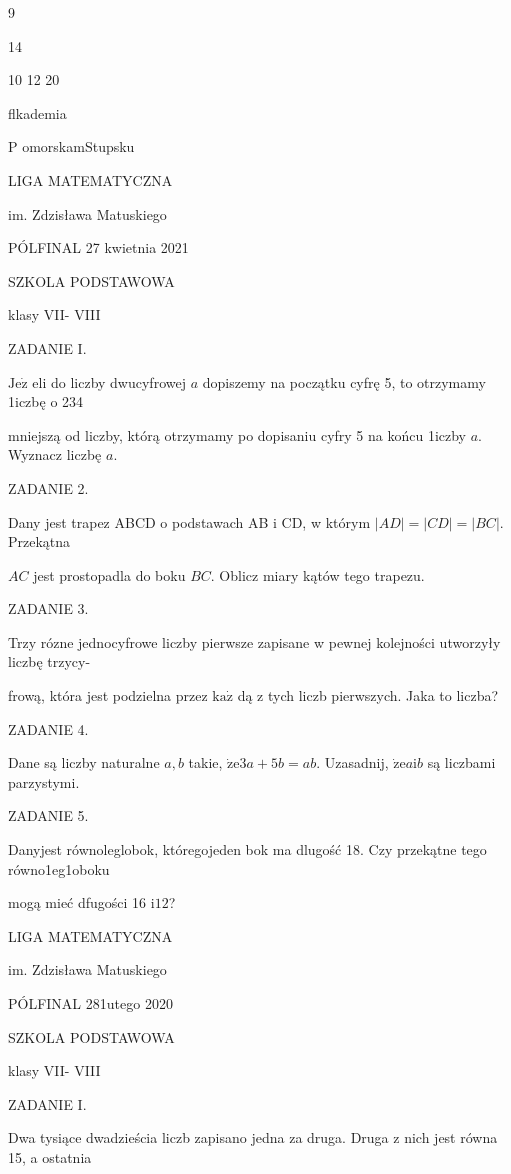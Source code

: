 \documentclass[a4paper,12pt]{article}
\begin{document}
9

14

10  12  20






flkademia

P omorskamStupsku

LIGA MATEMATYCZNA

im. Zdzisława Matuskiego

PÓLFINAL 27 kwietnia 2021

SZKOLA PODSTAWOWA

klasy VII- VIII

ZADANIE I.

$\mathrm{J}\mathrm{e}\dot{\mathrm{z}}$ eli do liczby dwucyfrowej $a$ dopiszemy na początku cyfrę 5, to otrzymamy 1iczbę o 234

mniejszą od liczby, którą otrzymamy po dopisaniu cyfry 5 na końcu 1iczby $a$. Wyznacz liczbę $a.$

ZADANIE 2.

Dany jest trapez ABCD o podstawach AB $\mathrm{i}$ CD, w którym $|AD|=|CD|=|BC|$. Przekątna

$AC$ jest prostopadla do boku $BC$. Oblicz miary kątów tego trapezu.

ZADANIE 3.

Trzy rózne jednocyfrowe liczby pierwsze zapisane w pewnej kolejności utworzyły liczbę trzycy-

frową, która jest podzielna przez $\mathrm{k}\mathrm{a}\dot{\mathrm{z}}$ dą z tych liczb pierwszych. Jaka to liczba?

ZADANIE 4.

Dane są liczby naturalne $a, b$ takie, $\dot{\mathrm{z}}\mathrm{e}3a+5b=ab$. Uzasadnij, $\dot{\mathrm{z}}\mathrm{e}a\mathrm{i}b$ są liczbami parzystymi.

ZADANIE 5.

Danyjest równoleglobok, któregojeden bok ma dlugość 18. Czy przekątne tego równo1eg1oboku

mogą mieć dfugości 16 $\mathrm{i}12$?






LIGA MATEMATYCZNA

im. Zdzisława Matuskiego

PÓLFINAL 281utego 2020

SZKOLA PODSTAWOWA

klasy VII- VIII

ZADANIE I.

Dwa tysiące dwadzieścia liczb zapisano jedna za druga. Druga z nich jest równa 15, a ostatnia
\end{document}
